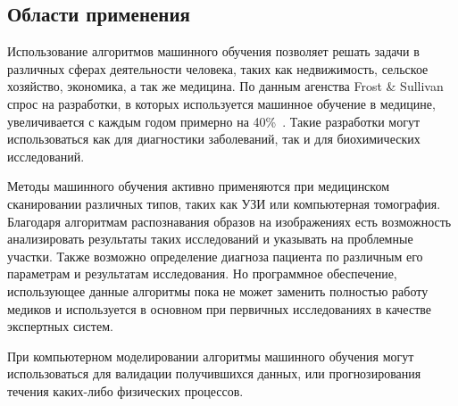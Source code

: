 \subsection{Области применения}
Использование алгоритмов машинного обучения позволяет решать задачи в различных сферах деятельности человека, таких как недвижимость, сельское хозяйство, экономика, а так же медицина. По данным агенства Frost \& Sullivan спрос на разработки, в которых используется машинное обучение в медицине, увеличивается с каждым годом примерно на 40\%~\cite{habrbigdatamedicine}. Такие разработки могут использоваться как для диагностики заболеваний, так  и для биохимических исследований.
\par
Методы машинного обучения активно применяются при медицинском сканировании различных типов, таких как УЗИ или компьютерная томография. Благодаря алгоритмам распознавания образов на изображениях есть возможность анализировать результаты таких исследований и указывать на проблемные участки. Также возможно определение диагноза пациента по различным его параметрам и результатам исследования. Но программное обеспечение, использующее данные алгоритмы пока не может заменить полностью работу медиков и используется в основном при первичных исследованиях в качестве экспертных систем.
\par
При компьютерном моделировании алгоритмы машинного обучения могут использоваться для валидации получившихся данных, или прогнозирования течения каких-либо физических процессов.

